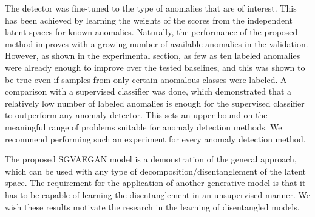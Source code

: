 The detector was fine-tuned to the type of anomalies that are of interest. This has been achieved by learning the weights of the scores from the independent latent spaces for known anomalies. Naturally, the performance of the proposed method improves with a growing number of available anomalies in the validation. However, as shown in the experimental section, as few as ten labeled anomalies were already enough to improve over the tested baselines, and this was shown to be true even if samples from only certain anomalous classes were labeled. A comparison with a supervised classifier was done, which demonstrated that a relatively low number of labeled anomalies is enough for the supervised classifier to outperform any anomaly detector. This sets an upper bound on the meaningful range of problems suitable for anomaly detection methods. We recommend performing such an experiment for every anomaly detection method. 

The proposed SGVAEGAN model is a demonstration of the general approach, which can be used with any type of decomposition/disentanglement of the latent space. The requirement for the application of another generative model is that it has to be capable of learning the disentanglement in an unsupervised manner. We wish these results motivate the research in the learning of disentangled models. 
